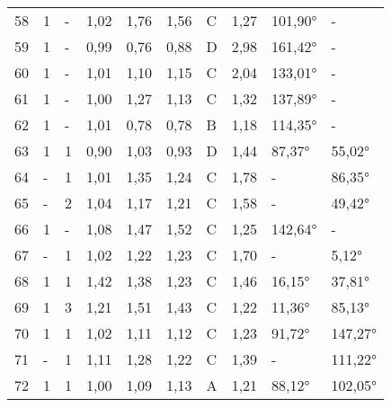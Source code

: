 \begin{longtable}{p{0.7cm}p{1.4cm}p{1.4cm}p{1cm}p{1cm}p{1cm}p{1cm}p{1cm}p{1cm}p{1cm}}
\small{58} & \small{1} & \small{-} & \small{1,02} & \small{1,76} & \small{1,56} & \small{C} & \small{1,27} & \small{101,90°} & \small{-}\\
\small{59} & \small{1} & \small{-} & \small{0,99} & \small{0,76} & \small{0,88} & \small{D} & \small{2,98} & \small{161,42°} & \small{-}\\
\small{60} & \small{1} & \small{-} & \small{1,01} & \small{1,10} & \small{1,15} & \small{C} & \small{2,04} & \small{133,01°} & \small{-}\\
\small{61} & \small{1} & \small{-} & \small{1,00} & \small{1,27} & \small{1,13} & \small{C} & \small{1,32} & \small{137,89°} & \small{-}\\
\small{62} & \small{1} & \small{-} & \small{1,01} & \small{0,78} & \small{0,78} & \small{B} & \small{1,18} & \small{114,35°} & \small{-}\\
\small{63} & \small{1} & \small{1} & \small{0,90} & \small{1,03} & \small{0,93} & \small{D} & \small{1,44} & \small{87,37°} & \small{55,02°}\\
\small{64} & \small{-} & \small{1} & \small{1,01} & \small{1,35} & \small{1,24} & \small{C} & \small{1,78} & \small{-} & \small{86,35°}\\
\small{65} & \small{-} & \small{2} & \small{1,04} & \small{1,17} & \small{1,21} & \small{C} & \small{1,58} & \small{-} & \small{49,42°}\\
\small{66} & \small{1} & \small{-} & \small{1,08} & \small{1,47} & \small{1,52} & \small{C} & \small{1,25} & \small{142,64°} & \small{-}\\
\small{67} & \small{-} & \small{1} & \small{1,02} & \small{1,22} & \small{1,23} & \small{C} & \small{1,70} & \small{-} & \small{5,12°}\\
\small{68} & \small{1} & \small{1} & \small{1,42} & \small{1,38} & \small{1,23} & \small{C} & \small{1,46} & \small{16,15°} & \small{37,81°}\\
\small{69} & \small{1} & \small{3} & \small{1,21} & \small{1,51} & \small{1,43} & \small{C} & \small{1,22} & \small{11,36°} & \small{85,13°}\\
\small{70} & \small{1} & \small{1} & \small{1,02} & \small{1,11} & \small{1,12} & \small{C} & \small{1,23} & \small{91,72°} & \small{147,27°}\\
\small{71} & \small{-} & \small{1} & \small{1,11} & \small{1,28} & \small{1,22} & \small{C} & \small{1,39} & \small{-} & \small{111,22°}\\
\small{72} & \small{1} & \small{1} & \small{1,00} & \small{1,09} & \small{1,13} & \small{A} & \small{1,21} & \small{88,12°} & \small{102,05°}\\

\end{longtable}
